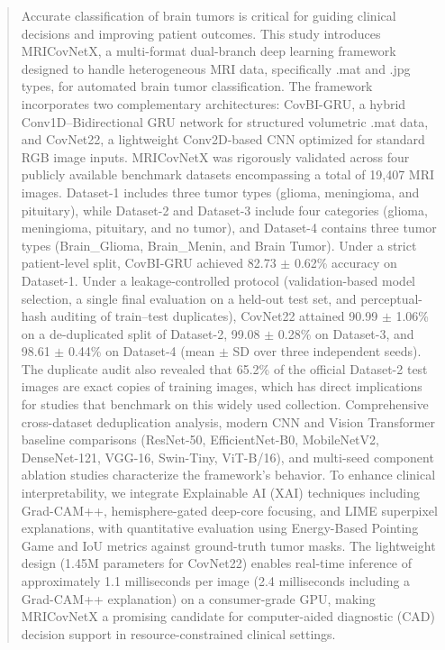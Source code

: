 \documentclass[a4paper,fleqn]{cas-sc}
\begin{document}
        \begin{abstract}
        Accurate classification of brain tumors is critical for guiding clinical decisions and improving patient outcomes. This study introduces MRICovNetX, a multi-format dual-branch deep learning framework designed to handle heterogeneous MRI data, specifically .mat and .jpg types, for automated brain tumor classification. The framework incorporates two complementary architectures: CovBI-GRU, a hybrid Conv1D--Bidirectional GRU network for structured volumetric .mat data, and CovNet22, a lightweight Conv2D-based CNN optimized for standard RGB image inputs. MRICovNetX was rigorously validated across four publicly available benchmark datasets encompassing a total of 19,407 MRI images. Dataset-1 includes three tumor types (glioma, meningioma, and pituitary), while Dataset-2 and Dataset-3 include four categories (glioma, meningioma, pituitary, and no tumor), and Dataset-4 contains three tumor types (Brain\_Glioma, Brain\_Menin, and Brain Tumor). Under a strict patient-level split, CovBI-GRU achieved 82.73 $\pm$ 0.62\% accuracy on Dataset-1. Under a leakage-controlled protocol (validation-based model selection, a single final evaluation on a held-out test set, and perceptual-hash auditing of train--test duplicates), CovNet22 attained 90.99 $\pm$ 1.06\% on a de-duplicated split of Dataset-2, 99.08 $\pm$ 0.28\% on Dataset-3, and 98.61 $\pm$ 0.44\% on Dataset-4 (mean $\pm$ SD over three independent seeds). The duplicate audit also revealed that 65.2\% of the official Dataset-2 test images are exact copies of training images, which has direct implications for studies that benchmark on this widely used collection. Comprehensive cross-dataset deduplication analysis, modern CNN and Vision Transformer baseline comparisons (ResNet-50, EfficientNet-B0, MobileNetV2, DenseNet-121, VGG-16, Swin-Tiny, ViT-B/16), and multi-seed component ablation studies characterize the framework's behavior. To enhance clinical interpretability, we integrate Explainable AI (XAI) techniques including Grad-CAM++, hemisphere-gated deep-core focusing, and LIME superpixel explanations, with quantitative evaluation using Energy-Based Pointing Game and IoU metrics against ground-truth tumor masks. The lightweight design (1.45M parameters for CovNet22) enables real-time inference of approximately 1.1 milliseconds per image (2.4 milliseconds including a Grad-CAM++ explanation) on a consumer-grade GPU, making MRICovNetX a promising candidate for computer-aided diagnostic (CAD) decision support in resource-constrained clinical settings.
        \end{abstract}
\end{document}
